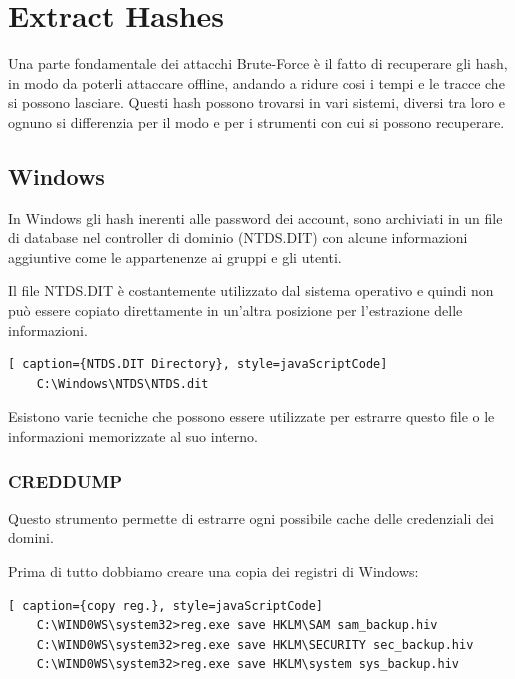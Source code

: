 \chapter{Extract Hashes}
Una parte fondamentale dei attacchi Brute-Force è il fatto di recuperare gli hash, in modo da poterli attaccare offline, andando a ridure cosi i tempi e le tracce che si possono lasciare.
Questi hash possono trovarsi in vari sistemi, diversi tra loro e ognuno si differenzia per il modo e per i strumenti con cui si possono recuperare.
\section{Windows}
In Windows gli hash inerenti alle password dei account, sono archiviati in un file di database nel controller di dominio (NTDS.DIT) con alcune informazioni aggiuntive come le appartenenze ai gruppi e gli utenti.

Il file NTDS.DIT è costantemente utilizzato dal sistema operativo e quindi non può essere copiato direttamente in un'altra posizione per l'estrazione delle informazioni.
\begin{lstlisting}[ caption={NTDS.DIT Directory}, style=javaScriptCode]
    C:\Windows\NTDS\NTDS.dit
\end{lstlisting}

Esistono varie tecniche che possono essere utilizzate per estrarre questo file o le informazioni memorizzate al suo interno.

\subsection{CREDDUMP}

Questo strumento\cite{CREDDUMP} permette di estrarre ogni possibile cache delle credenziali dei domini.

Prima di tutto dobbiamo creare una copia dei registri di Windows:

\begin{lstlisting}[ caption={copy reg.}, style=javaScriptCode]
    C:\WIND0WS\system32>reg.exe save HKLM\SAM sam_backup.hiv
    C:\WIND0WS\system32>reg.exe save HKLM\SECURITY sec_backup.hiv
    C:\WIND0WS\system32>reg.exe save HKLM\system sys_backup.hiv
    \end{lstlisting}


